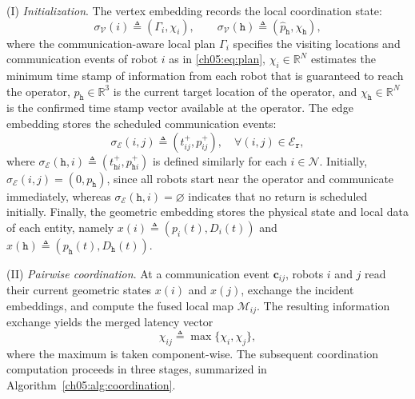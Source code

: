 (I) \emph{Initialization}.
The vertex embedding records the local coordination state:
\begin{equation}
\sigma_{\mathcal{V}}(i) \triangleq (\Gamma_i, \chi_i), \qquad
\sigma_{\mathcal{V}}(\texttt{h}) \triangleq
(\widehat{p}_{\texttt{h}}, \chi_{\texttt{h}}),
\label{ch05:eq:def-vertex-embed}
\end{equation}
where the communication-aware local plan $\Gamma_i$ specifies the visiting locations and
communication events of robot $i$ as in \eqref{ch05:eq:plan},
$\chi_i \in \mathbb{R}^{N}$ estimates the minimum time stamp of information
from each robot that is guaranteed to reach the operator,
$\widehat{p}_{\texttt{h}} \in \mathbb{R}^{3}$ is the current target location of
the operator, and $\chi_{\texttt{h}} \in \mathbb{R}^{N}$ is the confirmed time
stamp vector available at the operator. 
The edge embedding stores the scheduled communication events:
\begin{equation}
\sigma_{\mathcal{E}}(i, j) \triangleq (t_{ij}^{+}, p_{ij}^{+}),
\quad \forall (i, j) \in \mathcal{E}_{\texttt{r}},
\label{ch05:eq:def-edge-embed}
\end{equation}
where $\sigma_{\mathcal{E}}(\texttt{h}, i) \triangleq
(t_{\texttt{h}i}^{+}, p_{\texttt{h}i}^{+})$ is defined similarly for
each $i \in \mathcal{N}$. Initially,
$\sigma_{\mathcal{E}}(i, j) = (0, p_{\texttt{h}})$, since all robots start
near the operator and communicate immediately, whereas
$\sigma_{\mathcal{E}}(\texttt{h}, i) = \varnothing$ indicates that no return is
scheduled initially. Finally, the geometric embedding stores the physical state
and local data of each entity, namely
$x(i) \triangleq (p_i(t), D_i(t))$ and
$x(\texttt{h}) \triangleq (p_{\texttt{h}}(t), D_{\texttt{h}}(t))$.


(II) \emph{Pairwise coordination}.
At a communication event $\mathbf{c}_{ij}$, robots $i$ and $j$ read their
current geometric states $x(i)$ and $x(j)$, exchange the incident embeddings,
and compute the fused local map $\mathcal{M}_{ij}$. The resulting information
exchange yields the merged latency vector
\begin{equation}
\chi_{ij} \triangleq \max\{\chi_i, \chi_j\},
\label{ch05:eq:chi-merge}
\end{equation}
where the maximum is taken component-wise. The subsequent coordination
computation proceeds in three stages, summarized in
Algorithm~\ref{ch05:alg:coordination}.

